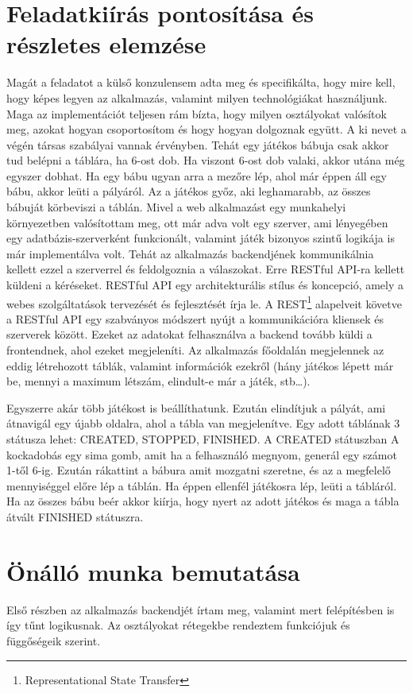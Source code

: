 \documentclass[a4paper,twoside]{article}
\begin{document}
\newpage

\section{Feladatkiírás pontosítása és részletes elemzése}
Magát a feladatot a külső konzulensem adta meg és specifikálta, hogy mire kell, hogy képes
legyen az alkalmazás, valamint milyen technológiákat használjunk. Maga az implementációt
teljesen rám bízta, hogy milyen osztályokat valósítok meg, azokat hogyan csoportosítom és
hogy hogyan dolgoznak együtt.
A ki nevet a végén társas szabályai vannak érvényben. Tehát egy játékos bábuja csak akkor
tud belépni a táblára, ha 6-ost dob. Ha viszont 6-ost dob valaki, akkor utána még egyszer
dobhat. Ha egy bábu ugyan arra a mezőre lép, ahol már éppen áll egy bábu, akkor leüti a
pályáról. Az a játékos győz, aki leghamarabb, az összes bábuját körbeviszi a táblán.
Mivel a web alkalmazást egy munkahelyi környezetben valósítottam meg, ott már adva volt
egy szerver, ami lényegében egy adatbázis-szerverként funkcionált, valamint játék bizonyos
szintű logikája is már implementálva volt. Tehát az alkalmazás backendjének kommunikálnia
kellett ezzel a szerverrel és feldolgoznia a válaszokat. Erre RESTful API-ra kellett küldeni a
kéréseket. RESTful API egy architekturális stílus és koncepció, amely a webes szolgáltatások
tervezését és fejlesztését írja le. A REST\footnote{Representational State Transfer} alapelveit követve
a RESTful API egy szabványos módszert nyújt a kommunikációra kliensek és szerverek
között. Ezeket az adatokat felhasználva a backend tovább küldi a frontendnek, ahol ezeket
megjeleníti.
Az alkalmazás főoldalán megjelennek az eddig létrehozott táblák, valamint információk
ezekről (hány játékos lépett már be, mennyi a maximum létszám, elindult-e már a játék,
stb…). 

Egyszerre akár több játékost is beállíthatunk. Ezután elindítjuk a pályát, ami átnavigál egy
újabb oldalra, ahol a tábla van megjelenítve. Egy adott táblának 3 státusza lehet: CREATED,
STOPPED, FINISHED. A CREATED státuszban A kockadobás egy sima gomb, amit ha a
felhasználó megnyom, generál egy számot 1-től 6-ig. Ezután rákattint a bábura amit mozgatni
szeretne, és az a megfelelő mennyiséggel előre lép a táblán. Ha éppen ellenfél játékosra lép,
leüti a tábláról. Ha az összes bábu beér akkor kiírja, hogy nyert az adott játékos és maga a
tábla átvált FINISHED státuszra. 
\newpage

\section{Önálló munka bemutatása}
Első részben az alkalmazás backendjét írtam meg, valamint mert felépítésben is így tűnt
logikusnak. Az osztályokat rétegekbe rendeztem funkciójuk és függőségeik szerint.
\end{document}
